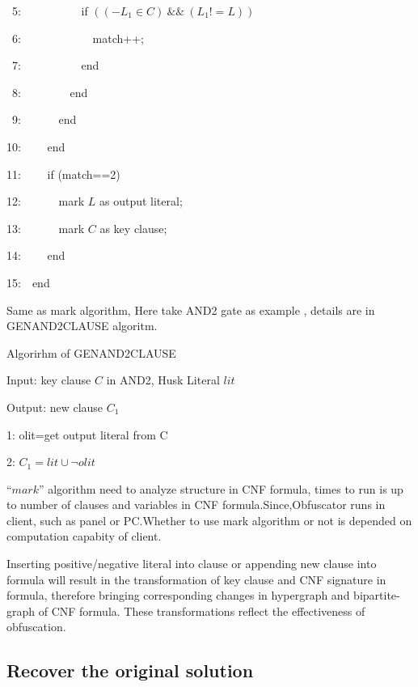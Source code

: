 \documentclass[runningheads,a4paper]{llncs}
\begin{document}
~5:~~~~~~~~~~		  if $((-L_1 \in C)~\&\&~(L_1!=L))$

~6:~~~~~~~~~~~~				match++;

~7:~~~~~~~~~~		  end

~8:~~~~~~~~		end

~9:~~~~~~          end 

10:~~~~	    end

11:~~~~     if (match==2)

12:~~~~~~	  mark $L$ as output literal;

13:~~~~~~	  mark $C$ as key clause;

14:~~~~     end

15:~~end

Same as mark algorithm, Here take AND2 gate as example , details are in GENAND2CLAUSE algoritm.

\noindent Algorirhm of GENAND2CLAUSE

Input: key clause $C$ in AND2, Husk Literal $lit$

Output: new clause $C_1$

1: olit=get output literal from C

2: $C_1= lit \cup \neg olit$

$“mark”$ algorithm need to analyze structure in CNF formula, times to run is up to number of clauses and variables in CNF formula.Since,Obfuscator runs in client, such as panel or PC.Whether to use mark algorithm or not is depended on computation capabity of client.

Inserting positive/negative literal into clause or appending new clause into formula will result in the transformation of key clause and CNF signature in formula, 
therefore bringing corresponding changes in hypergraph and bipartite-graph of CNF formula.
These transformations reflect the effectiveness of obfuscation.
\subsection{Recover the original solution}
\end{document}
